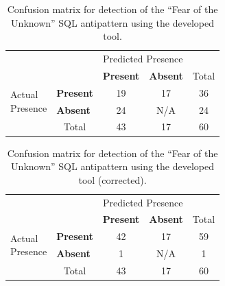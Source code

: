 \begin{table}[H]
    \centering
    \caption{Confusion matrix for detection of the “Fear of the Unknown” SQL antipattern using the developed tool.}
    \label{tab:fearOfTheUnknownConfusion}
    \begin{tabular}{l|l|c|c|c}
        \multicolumn{2}{c}{}&\multicolumn{2}{c}{Predicted Presence}&\\
        \cline{3-4}
        \multicolumn{2}{c|}{}&\textbf{Present}&\textbf{Absent}&\multicolumn{1}{c}{Total}\\
        \cline{2-4}
        \multirow{2}{1.5cm}{Actual\\Presence}& \textbf{Present} & 19 & 17 & 36\\
        \cline{2-4}
        & \textbf{Absent} & 24 & N/A & 24\\
        \cline{2-4}
        \multicolumn{1}{c}{} & \multicolumn{1}{c}{Total} & \multicolumn{1}{c}{43} & \multicolumn{1}{c}{17} & \multicolumn{1}{c}{60}\\
    \end{tabular}
\end{table}

\begin{table}[H]
    \centering
    \caption{Confusion matrix for detection of the “Fear of the Unknown” SQL antipattern using the developed tool (corrected).}
    \label{tab:fearOfTheUnknownConfusionCorrected}
    \begin{tabular}{l|l|c|c|c}
        \multicolumn{2}{c}{}&\multicolumn{2}{c}{Predicted Presence}&\\
        \cline{3-4}
        \multicolumn{2}{c|}{}&\textbf{Present}&\textbf{Absent}&\multicolumn{1}{c}{Total}\\
        \cline{2-4}
        \multirow{2}{1.5cm}{Actual\\Presence}& \textbf{Present} & 42 & 17 & 59\\
        \cline{2-4}
        & \textbf{Absent} & 1 & N/A & 1\\
        \cline{2-4}
        \multicolumn{1}{c}{} & \multicolumn{1}{c}{Total} & \multicolumn{1}{c}{43} & \multicolumn{1}{c}{17} & \multicolumn{1}{c}{60}\\
    \end{tabular}
\end{table}

